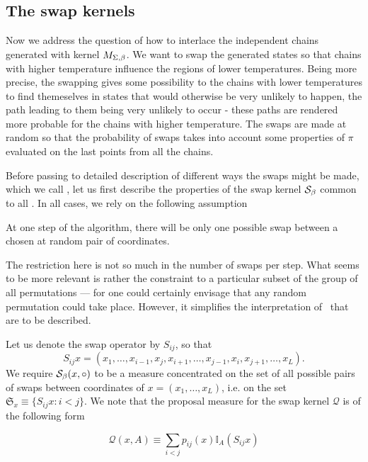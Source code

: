 \documentclass{article}
\begin{document}
	\subsection*{The swap kernels}

Now we address the question of how to interlace the independent chains generated with kernel $M_{\Sigma,\beta}$. We want to swap the generated states so that chains with higher temperature influence the regions of lower temperatures. Being more precise, the swapping gives some possibility to the chains with lower temperatures to find themeselves in states that would otherwise be very unlikely to happen, the path leading to them being very unlikely to occur - these paths are rendered more probable for the chains with higher temperature. The swaps are made at random so that the probability of swaps takes into account some properties of $\pi$ evaluated on the last points from all the chains. 

Before passing to detailed description of different ways the swaps might be made, which we call \strats, let us first describe the properties of the swap kernel $\mathcal{S}_{\beta}$ common to all \strats. In all cases, we rely on the following assumption

\begin{assumptions}[resume]
	\item At one step of the algorithm, there will be only one possible swap between a chosen at random pair of coordinates.
\end{assumptions}

The restriction here is not so much in the number of swaps per step. What seems to be more relevant is rather the constraint to a particular subset of the group of all permutations --- for one could certainly envisage that any random permutation could take place. However, it simplifies the interpretation of \strats\, that are to be described. 

Let us denote the swap operator by $S_{ij}$, so that 
$$S_{ij} x = (x_1, \dots, x_{i-1}, x_j, x_{i+1}, \dots, x_{j-1}, x_i, x_{j+1}, \dots, x_L).$$ 
We require $\mathcal{S}_{\beta}(x, \circ )$ to be a measure concentrated on the set of all possible pairs of swaps between coordinates of $x = (x_1, \dots, x_L)$, i.e. on the set $\mathfrak{S}_x \equiv \{ S_{ij}x : i < j  \}$. We note that the proposal measure for the swap kernel $\mathcal{Q}$ is of the following form 

\begin{equation*}
	\mathcal{Q}(x, A) \equiv \underset{i < j}{\sum} p_{ij}(x) \mathbb{I}_A (S_{ij} x)
\end{equation*}	 
\end{document}
